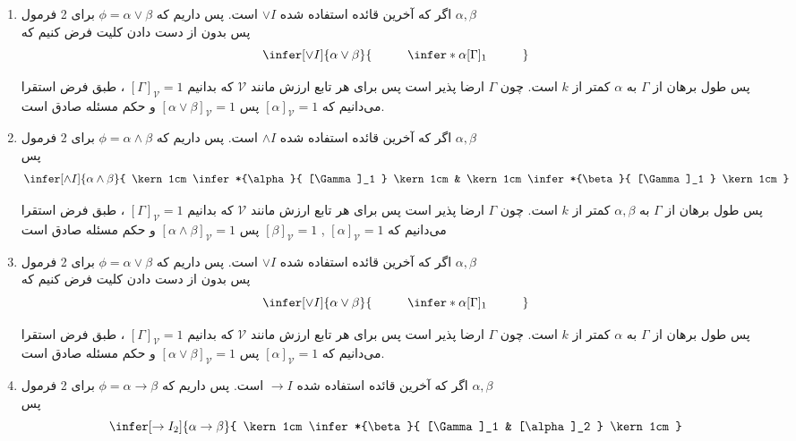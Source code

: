 \begin {ans}
\begin {enumerate}
		
		
		\item اگر که آخرین قائده استفاده شده
		$\vee I$ است. پس داریم 
		که
		 $\phi = \alpha \vee \beta$ 
		برای 2 فرمول
		 $\alpha , \beta$\\
		  پس بدون از دست دادن کلیت فرض کنیم که
		$$
		\infer[\vee I]{\alpha \vee \beta}{
			\kern 1cm	
			\infer*{\alpha}{
				[\Gamma]_1
			}
			\kern 1cm
		}
		$$
		
		پس طول برهان از 
		$\Gamma$
		به
		 $\alpha$
		  کمتر از $k$ است.
		 چون $\Gamma$ ارضا پذیر است پس برای هر تابع ارزش مانند $\mathcal {V}$ که بدانیم
		$[\Gamma]_\mathcal{V} = 1$ 
		، طبق فرض استقرا می‌دانیم که
		$[\alpha]_\mathcal{V} = 1$
		پس 
		$[\alpha \vee \beta]_\mathcal{V} = 1$
		و حکم مسئله صادق است.
		
		
		
		\item اگر که آخرین قائده استفاده شده
		$\wedge I$ است. پس داریم 
		که
		$\phi = \alpha \wedge \beta$ 
		برای 2 فرمول
		$\alpha , \beta$\\
		پس 
		$$
		\infer[\wedge I]{\alpha \wedge \beta}{
			\kern 1cm	
			\infer*{\alpha}{
				[\Gamma]_1
			}
			\kern 1cm
			&
			\kern 1cm	
			\infer*{\beta}{
				[\Gamma]_1
			}
			\kern 1cm
		}
		$$
		
		پس طول برهان از 
		$\Gamma$
		به
		$\alpha , \beta$ 
		کمتر از $k$ است.
		چون $\Gamma$ ارضا پذیر است پس برای هر تابع ارزش مانند $\mathcal {V}$ که بدانیم
		$[\Gamma]_\mathcal{V} = 1$ 
		، طبق فرض استقرا می‌دانیم که
		$[\alpha]_\mathcal{V} = 1$ , $[\beta]_\mathcal{V} = 1$
		پس 
		$[\alpha \wedge \beta]_\mathcal{V} = 1$
		و حکم مسئله صادق است
		
		
		\item اگر که آخرین قائده استفاده شده
		$\vee I$ است. پس داریم 
		که
		$\phi = \alpha \vee \beta$ 
		برای 2 فرمول
		$\alpha , \beta$\\
		پس بدون از دست دادن کلیت فرض کنیم که
		$$
		\infer[\vee I]{\alpha \vee \beta}{
			\kern 1cm	
			\infer*{\alpha}{
				[\Gamma]_1
			}
			\kern 1cm
		}
		$$
		
		پس طول برهان از 
		$\Gamma$
		به
		$\alpha$
		کمتر از $k$ است.
		چون $\Gamma$ ارضا پذیر است پس برای هر تابع ارزش مانند $\mathcal {V}$ که بدانیم
		$[\Gamma]_\mathcal{V} = 1$ 
		، طبق فرض استقرا می‌دانیم که
		$[\alpha]_\mathcal{V} = 1$
		پس 
		$[\alpha \vee \beta]_\mathcal{V} = 1$
		و حکم مسئله صادق است.
		
		
		
		\item اگر که آخرین قائده استفاده شده
		$\to I$ است. پس داریم 
		که
		$\phi = \alpha \to \beta$ 
		برای 2 فرمول
		$\alpha , \beta$\\
		پس 
		$$
		\infer[\to I_2]{\alpha \to \beta}{
			\kern 1cm	
			\infer*{\beta}{
				[\Gamma]_1
				&
				[\alpha]_2
			}
			\kern 1cm
		}
		$$
		

\end{enumerate}
\end{ans}
